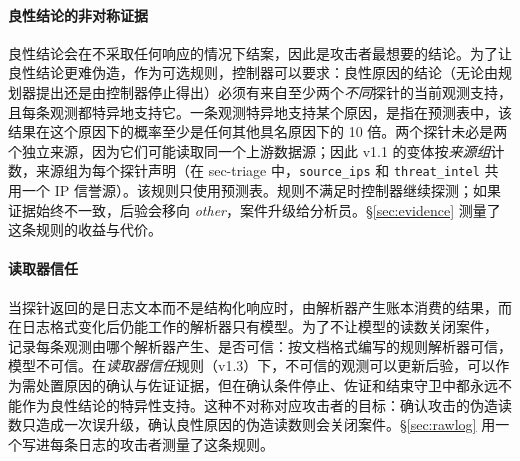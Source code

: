 \paragraph{良性结论的非对称证据} 良性结论会在不采取任何响应的情况下结案，因此是攻击者最想要的结论。为了让良性结论更难伪造，作为可选规则，控制器可以要求：良性原因的结论（无论由规划器提出还是由控制器停止得出）必须有来自至少两个\emph{不同}探针的当前观测支持，且每条观测都特异地支持它。一条观测特异地支持某个原因，是指在预测表中，该结果在这个原因下的概率至少是任何其他具名原因下的 10 倍。两个探针未必是两个独立来源，因为它们可能读取同一个上游数据源；因此 v1.1 的变体按\emph{来源组}计数，来源组为每个探针声明（在 sec-triage 中，\texttt{source\_ips} 和 \texttt{threat\_intel} 共用一个 IP 信誉源）。该规则只使用预测表。规则不满足时控制器继续探测；如果证据始终不一致，后验会移向 \textit{other}，案件升级给分析员。\S\ref{sec:evidence} 测量了这条规则的收益与代价。

\paragraph{读取器信任} 当探针返回的是日志文本而不是结构化响应时，由解析器产生账本消费的结果，而在日志格式变化后仍能工作的解析器只有模型。为了不让模型的读数关闭案件，\hesp{} 记录每条观测由哪个解析器产生、是否可信：按文档格式编写的规则解析器可信，模型不可信。在\emph{读取器信任}规则（v1.3）下，不可信的观测可以更新后验，可以作为需处置原因的确认与佐证证据，但在确认条件停止、佐证和结束守卫中都永远不能作为良性结论的特异性支持。这种不对称对应攻击者的目标：确认攻击的伪造读数只造成一次误升级，确认良性原因的伪造读数则会关闭案件。\S\ref{sec:rawlog} 用一个写进每条日志的攻击者测量了这条规则。
